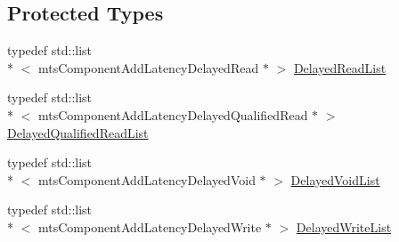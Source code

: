 \subsection*{Protected Types}
\begin{DoxyCompactItemize}
\item 
typedef std\-::list\\*
$<$ mts\-Component\-Add\-Latency\-Delayed\-Read $\ast$ $>$ \hyperlink{classmts_component_add_latency_a527c29b91f407598cb31a8113d453610}{Delayed\-Read\-List}
\item 
typedef std\-::list\\*
$<$ mts\-Component\-Add\-Latency\-Delayed\-Qualified\-Read $\ast$ $>$ \hyperlink{classmts_component_add_latency_a00e005acc3d0af37d43abee413e92d1e}{Delayed\-Qualified\-Read\-List}
\item 
typedef std\-::list\\*
$<$ mts\-Component\-Add\-Latency\-Delayed\-Void $\ast$ $>$ \hyperlink{classmts_component_add_latency_a693394372f8f73601e8f46ab5a5a1780}{Delayed\-Void\-List}
\item 
typedef std\-::list\\*
$<$ mts\-Component\-Add\-Latency\-Delayed\-Write $\ast$ $>$ \hyperlink{classmts_component_add_latency_a050cbf3819eb668c8098a78257e22236}{Delayed\-Write\-List}
\end{DoxyCompactItemize}
